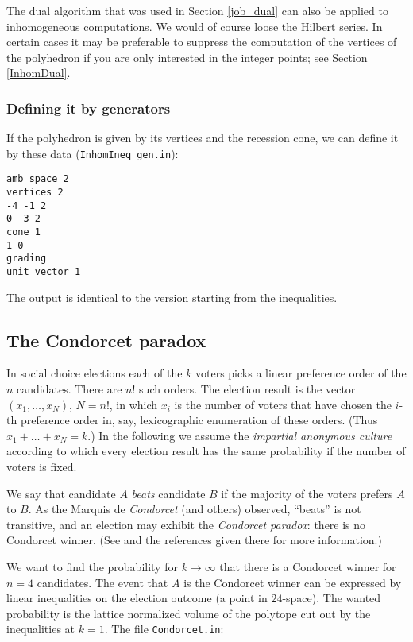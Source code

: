 \documentclass[12pt,a4paper]{scrartcl}
\theoremstyle{definition}
\begin{document}
The dual algorithm that was used in Section \ref{job_dual} can also be applied to inhomogeneous computations. We would of course loose the Hilbert series. In certain cases it may be preferable to suppress the computation of the vertices of the polyhedron if you are only interested in the integer points; see Section \ref{InhomDual}.

\subsubsection{Defining it by generators}\label{polyh_ex}

If the polyhedron is given by its vertices and the recession cone, we can define it by these data (\verb|InhomIneq_gen.in|):
\begin{Verbatim}
amb_space 2
vertices 2
-4 -1 2
0  3 2
cone 1
1 0
grading
unit_vector 1
\end{Verbatim}
The output is identical to the version starting from the inequalities.

\subsection{The Condorcet paradox}\label{Condorcet}

In social choice elections each of the $k$ voters picks a linear preference order of the $n$ candidates. There are $n!$ such orders. The election result is the vector $(x_1,\dots,x_N)$, $N=n!$, in which $x_i$ is the number of voters that have chosen the $i$-th preference order in, say, lexicographic enumeration of these orders. (Thus $x_1+\dots+x_N=k$.) In the following we assume the \emph{impartial anonymous culture} according to which every election result has the same probability if the number of voters is fixed. 
\medskip 

We say that candidate $A$ \emph{beats} candidate $B$ if the majority of the voters prefers $A$ to $B$. As the Marquis de \emph{Condorcet} (and others) observed, ``beats'' is not transitive, and an election may exhibit the \emph{Condorcet paradox}: there is no Condorcet winner. (See \cite{BS} and the references given there for more information.)

We want to find the probability for $k\to\infty$ that there is a Condorcet winner for $n=4$ candidates. The event that $A$ is the Condorcet winner can be expressed by linear inequalities on the election outcome (a point in $24$-space). The wanted probability is the lattice normalized volume of the polytope cut out by the inequalities at $k=1$. The file \verb|Condorcet.in|:
\end{document}

